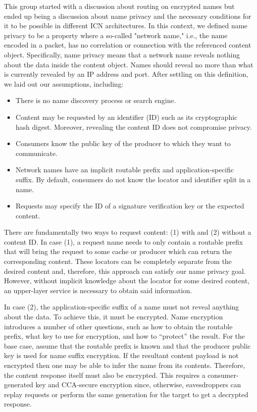 \documentclass[a4paper,UKenglish]{dagrep}
\begin{document}
This group started with a discussion about routing on encrypted names but ended up being a discussion about name privacy and the necessary conditions for it to be possible in different ICN architectures. In this context, we defined name privacy to be a property where a so-called "network name," i.e., the name encoded in a packet, has no correlation or connection with the referenced content object. Specifically, name privacy means that a network name reveals nothing about the data inside the content object. Names should reveal no more than what is currently revealed by an IP address and port. After settling on this definition, we laid out our assumptions, including:

\begin{itemize}
\item There is no name discovery process or search engine.
\item Content may be requested by an identifier (ID) such as its cryptographic hash digest. Moreover, revealing the content ID does not compromise privacy.
\item Consumers know the public key of the producer to which they want to communicate.
\item Network names have an implicit routable prefix and application-specific suffix. By default, consumers do not know the locator and identifier split in a name.
\item Requests may specify the ID of a signature verification key or the expected content.
\end{itemize}

There are fundamentally two ways to request content: (1) with and (2) without a content ID. In case (1), a request name needs to only contain a routable prefix that will bring the request to some cache or producer which can return the corresponding content. These locators can be completely separate from the desired content and, therefore, this approach can satisfy our name privacy goal. However, without implicit knowledge about the locator for some desired content, an upper-layer service is necessary to obtain said information.

In case (2), the application-specific suffix of a name must not reveal anything about the data. To achieve this, it must be encrypted. Name encryption introduces a number of other questions, such as how to obtain the routable prefix, what key to use for encryption, and how to ``protect'' the result. For the base case, assume that the routable prefix is known and that the producer public key is used for name suffix encryption. If the resultant content payload is not encrypted then one may be able to infer the name from its contents. Therefore, the content response itself must also be encrypted. This requires a consumer-generated key and CCA-secure encryption since, otherwise, eavesdroppers can replay requests or perform the same generation for the target to get a decrypted response.
\end{document}
